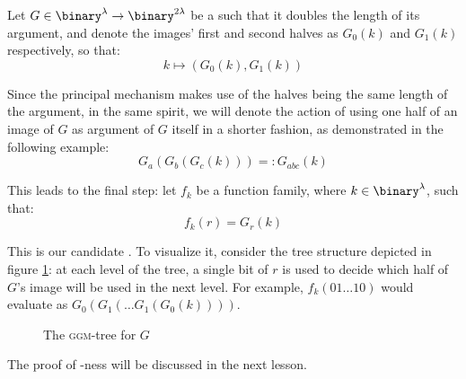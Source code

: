 \begin{construction}
    Let $G \in \binary^\lambda \to \binary^{2\lambda}$ be a \prg{} such that it doubles the length of its argument, and denote the images' first and second halves as $G_0(k)$ and $G_1(k)$ respectively, so that: 
    \[
        k \mapsto (G_0(k), G_1(k))
    \]

    Since the principal mechanism makes use of the halves being the same length of the argument, in the same spirit, we will denote the action of using one half of an image of $G$ as argument of $G$ itself in a shorter fashion, as demonstrated in the following example:
    \[
        G_a(G_b(G_c(k))) =: G_{abc}(k)
    \]

    This leads to the final step: let $f_k$ be a function family, where $k \in \binary^\lambda$, such that:
    \[
        f_k(r) = G_r(k)
    \]

    This is our candidate \prf. To visualize it, consider the tree structure depicted in figure \ref{fig:ggmtree}: at each level of the tree, a single bit of $r$ is used to decide which half of $G$'s image will be used in the next level. For example, $f_k(01 \dots 10)$ would evaluate as $G_0(G_1( \dots G_1(G_0(k))))$.

    \begin{figure}
        \centering
        \caption{The \textsc{ggm}-tree for $G$}
        \label{fig:ggmtree}
    \end{figure}

\end{construction}

The proof of \prf-ness will be discussed in the next lesson.
